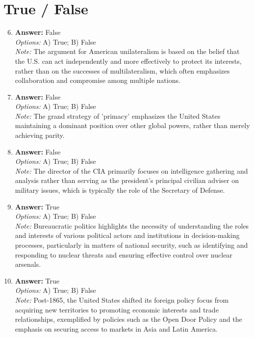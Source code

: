 \documentclass[12pt]{article}
\begin{document}
\section*{True / False}
\begin{enumerate}[label=\arabic*.]
\setcounter{enumi}{5}
\item \textbf{Answer:} False
\\ \textit{Options:} A) True; B) False
\\ \textit{Note:} The argument for American unilateralism is based on the belief that the U.S. can act independently and more effectively to protect its interests, rather than on the successes of multilateralism, which often emphasizes collaboration and compromise among multiple nations.
\item \textbf{Answer:} False
\\ \textit{Options:} A) True; B) False
\\ \textit{Note:} The grand strategy of 'primacy' emphasizes the United States maintaining a dominant position over other global powers, rather than merely achieving parity.
\item \textbf{Answer:} False
\\ \textit{Options:} A) True; B) False
\\ \textit{Note:} The director of the CIA primarily focuses on intelligence gathering and analysis rather than serving as the president's principal civilian adviser on military issues, which is typically the role of the Secretary of Defense.
\item \textbf{Answer:} True
\\ \textit{Options:} A) True; B) False
\\ \textit{Note:} Bureaucratic politics highlights the necessity of understanding the roles and interests of various political actors and institutions in decision-making processes, particularly in matters of national security, such as identifying and responding to nuclear threats and ensuring effective control over nuclear arsenals.
\item \textbf{Answer:} True
\\ \textit{Options:} A) True; B) False
\\ \textit{Note:} Post-1865, the United States shifted its foreign policy focus from acquiring new territories to promoting economic interests and trade relationships, exemplified by policies such as the Open Door Policy and the emphasis on securing access to markets in Asia and Latin America.
\end{enumerate}
\end{document}
